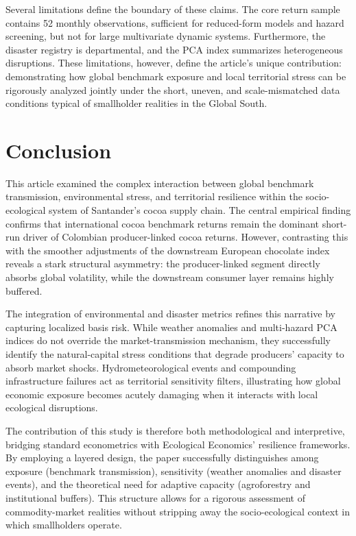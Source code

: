 \documentclass[11pt]{article}
\begin{document}
Several limitations define the boundary of these claims. The core return sample contains 52 monthly observations, sufficient for reduced-form models and hazard screening, but not for large multivariate dynamic systems. Furthermore, the disaster registry is departmental, and the PCA index summarizes heterogeneous disruptions. These limitations, however, define the article's unique contribution: demonstrating how global benchmark exposure and local territorial stress can be rigorously analyzed jointly under the short, uneven, and scale-mismatched data conditions typical of smallholder realities in the Global South. 

\section{Conclusion}
\label{sec:conclusion}

This article examined the complex interaction between global benchmark transmission, environmental stress, and territorial resilience within the socio-ecological system of Santander's cocoa supply chain. The central empirical finding confirms that international cocoa benchmark returns remain the dominant short-run driver of Colombian producer-linked cocoa returns. However, contrasting this with the smoother adjustments of the downstream European chocolate index reveals a stark structural asymmetry: the producer-linked segment directly absorbs global volatility, while the downstream consumer layer remains highly buffered. 

The integration of environmental and disaster metrics refines this narrative by capturing localized basis risk. While weather anomalies and multi-hazard PCA indices do not override the market-transmission mechanism, they successfully identify the natural-capital stress conditions that degrade producers' capacity to absorb market shocks. Hydrometeorological events and compounding infrastructure failures act as territorial sensitivity filters, illustrating how global economic exposure becomes acutely damaging when it interacts with local ecological disruptions.

The contribution of this study is therefore both methodological and interpretive, bridging standard econometrics with Ecological Economics' resilience frameworks. By employing a layered design, the paper successfully distinguishes among exposure (benchmark transmission), sensitivity (weather anomalies and disaster events), and the theoretical need for adaptive capacity (agroforestry and institutional buffers). This structure allows for a rigorous assessment of commodity-market realities without stripping away the socio-ecological context in which smallholders operate.
\end{document}
